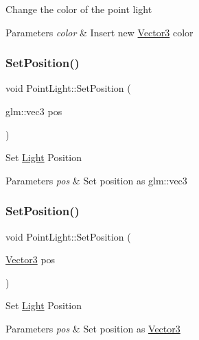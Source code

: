 Change the color of the point light 
\begin{DoxyParams}{Parameters}
{\em color} & Insert new \mbox{\hyperlink{struct_vector3}{Vector3}} color \\
\hline
\end{DoxyParams}
\mbox{\label{class_point_light_a707125b77b9ae421f43760540496c5d0}} 
\subsubsection{\texorpdfstring{SetPosition()}{SetPosition()}\hspace{0.1cm}{\footnotesize\ttfamily [1/2]}}
{\footnotesize\ttfamily void Point\+Light\+::\+Set\+Position (\begin{DoxyParamCaption}\item[{glm\+::vec3}]{pos }\end{DoxyParamCaption})}

Set \mbox{\hyperlink{class_light}{Light}} Position 
\begin{DoxyParams}{Parameters}
{\em pos} & Set position as glm\+::vec3 \\
\hline
\end{DoxyParams}
\mbox{\label{class_point_light_a49025fcac39e59e0ac0ed6c46ac290bb}} 
\subsubsection{\texorpdfstring{SetPosition()}{SetPosition()}\hspace{0.1cm}{\footnotesize\ttfamily [2/2]}}
{\footnotesize\ttfamily void Point\+Light\+::\+Set\+Position (\begin{DoxyParamCaption}\item[{\mbox{\hyperlink{struct_vector3}{Vector3}}}]{pos }\end{DoxyParamCaption})}

Set \mbox{\hyperlink{class_light}{Light}} Position 
\begin{DoxyParams}{Parameters}
{\em pos} & Set position as \mbox{\hyperlink{struct_vector3}{Vector3}} \\
\hline
\end{DoxyParams}
\mbox{\label{class_point_light_a1cc5f1e9a33b13cef881e4ef555ff074}} 
